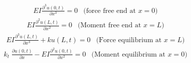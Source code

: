 \documentclass[]{report}
\begin{document}
\begin{eqnarray}
E I\frac{\partial^3{u\left(0,t\right)}}{\partial{x^3}}=0\nonumber & \text{(force free end at $x=0$)}
\end{eqnarray}
\begin{eqnarray}
E I\frac{\partial^2{u\left(L,t\right)}}{\partial{x^2}}=0\nonumber&\text{(Moment free end at $x=L$)}
\end{eqnarray}
\begin{eqnarray} 
E I\frac{\partial^3{u\left(L,t\right)}}{\partial{x^3}}+k u \left(L,t\right) =0\nonumber&
\text{(Force equilibrium at $x=L$)}
\end{eqnarray}
\begin{eqnarray}
k_t  \; \frac{\partial{u{\left(0,t\right)}}}{\partial{x}} -E I\frac{\partial^2{u\left(0,t\right)}}{\partial{x^2}} =0\nonumber&
\text{(Moment equilibrium at $x=0$)}
\end{eqnarray}


\end{document}
